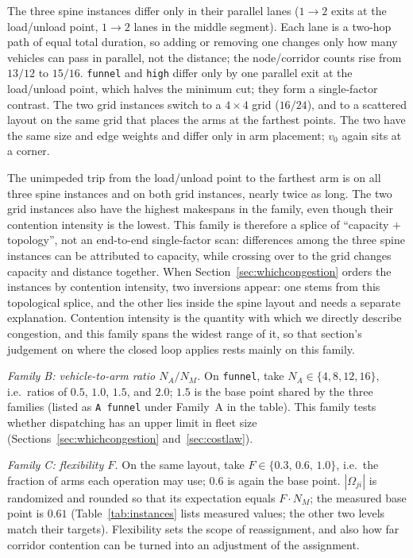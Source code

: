 The three spine instances differ only in their parallel lanes ($1\to2$ exits at the load/unload point, $1\to2$ lanes in the middle segment). Each lane is a two-hop path of equal total duration, so adding or removing one changes only how many vehicles can pass in parallel, not the distance; the node/corridor counts rise from $13/12$ to $15/16$.
\texttt{funnel} and \texttt{high} differ only by one parallel exit at the load/unload point, which halves the minimum cut; they form a single-factor contrast.
The two grid instances switch to a $4\times4$ grid ($16/24$), and to a scattered layout on the same grid that places the arms at the farthest points. The two have the same size and edge weights and differ only in arm placement; $v_0$ again sits at a corner.

The unimpeded trip from the load/unload point to the farthest arm is \LegDumbbell{} on all three spine instances and \LegGrid{} on both grid instances, nearly twice as long.
The two grid instances also have the highest makespans in the family, even though their contention intensity is the lowest.
This family is therefore a splice of ``capacity $+$ topology'', not an end-to-end single-factor scan: differences among the three spine instances can be attributed to capacity, while crossing over to the grid changes capacity and distance together.
When Section~\ref{sec:whichcongestion} orders the instances by contention intensity, two inversions appear: one stems from this topological splice, and the other lies inside the spine layout and needs a separate explanation.
Contention intensity is the quantity with which we directly describe congestion, and this family spans the widest range of it, so that section's judgement on where the closed loop applies rests mainly on this family.

\emph{Family B: vehicle-to-arm ratio $N_A/N_M$.}
On \texttt{funnel}, take $N_A\in\{4,8,12,16\}$, i.e.\ ratios of $0.5$, $1.0$, $1.5$, and $2.0$; $1.5$ is the base point shared by the three families (listed as \texttt{A funnel} under Family~A in the table).
This family tests whether dispatching has an upper limit in fleet size (Sections~\ref{sec:whichcongestion} and~\ref{sec:costlaw}).

\emph{Family C: flexibility $F$.}
On the same layout, take $F\in\{0.3,\,0.6,\,1.0\}$, i.e.\ the fraction of arms each operation may use; $0.6$ is again the base point.
$|\Omega_{ji}|$ is randomized and rounded so that its expectation equals $F\cdot N_M$; the measured base point is $0.61$ (Table~\ref{tab:instances} lists measured values; the other two levels match their targets).
Flexibility sets the scope of reassignment, and also how far corridor contention can be turned into an adjustment of the assignment.

